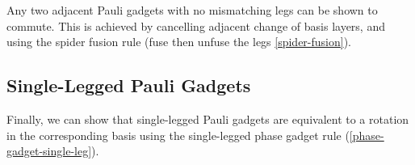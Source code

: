 Any two adjacent Pauli gadgets with no mismatching legs can be shown to commute. This is achieved by cancelling adjacent change of basis layers, and using the spider fusion rule (fuse then unfuse the legs \ref{spider-fusion}).



\subsection{Single-Legged Pauli Gadgets}%
\label{pauli-gadget-single-leg}

Finally, we can show that single-legged Pauli gadgets are equivalent to a rotation in the corresponding basis using the single-legged phase gadget rule (\ref{phase-gadget-single-leg}).


